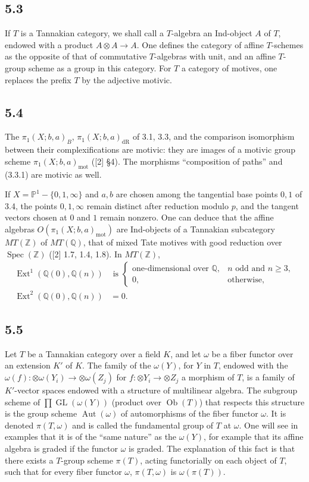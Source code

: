 \documentclass[10pt]{article}
\newcommand{\Q}{\mathbb Q}
\newcommand{\Z}{\mathbb Z}
\newcommand{\PP}{\mathbb P}
\newcommand{\Spec}{\operatorname{Spec}}
\newcommand{\Ext}{\operatorname{Ext}}
\newcommand{\Aut}{\operatorname{Aut}}
\newcommand{\GL}{\operatorname{GL}}
\newcommand{\Ob}{\operatorname{Ob}}
\newcommand{\dR}{\mathrm{dR}}
\newcommand{\mot}{\mathrm{mot}}
\begin{document}
\subsection*{5.3}
If $T$ is a Tannakian category, we shall call a $T$-algebra an Ind-object $A$ of $T$, endowed with a product $A\otimes A\to A$.
One defines the category of affine $T$-schemes as the opposite of that of commutative $T$-algebras with unit, and an affine $T$-group scheme as a group in this category.
For $T$ a category of motives, one replaces the prefix $T$ by the adjective motivic.

\subsection*{5.4}
The $\pi_1(X;b,a)_B$, $\pi_1(X;b,a)_{\dR}$ of 3.1, 3.3, and the comparison isomorphism between their complexifications are motivic: they are images of a motivic group scheme $\pi_1(X;b,a)_{\mot}$ ([2] \S4).
The morphisms ``composition of paths'' and (3.3.1) are motivic as well.

If $X=\PP^1-\{0,1,\infty\}$ and $a,b$ are chosen among the tangential base points $0,1$ of 3.4, the points $0,1,\infty$ remain distinct after reduction modulo $p$, and the tangent vectors chosen at $0$ and $1$ remain nonzero.
One can deduce that the affine algebras $O(\pi_1(X;b,a)_{\mot})$ are Ind-objects of a Tannakian subcategory $MT(\Z)$ of $MT(\Q)$, that of mixed Tate motives with good reduction over $\Spec(\Z)$ ([2] 1.7, 1.4, 1.8).
In $MT(\Z)$,
\begin{align}
 \Ext^1(\Q(0),\Q(n))&\text{ is }
 \begin{cases}
 \text{one-dimensional over }\Q,& n\text{ odd and }n\geq3,\\
 0,&\text{otherwise,}
 \end{cases}
\tag{5.4.1}\\
 \Ext^2(\Q(0),\Q(n))&=0.
\tag{5.4.2}
\end{align}

\subsection*{5.5}
Let $T$ be a Tannakian category over a field $K$, and let $\omega$ be a fiber functor over an extension $K'$ of $K$.
The family of the $\omega(Y)$, for $Y$ in $T$, endowed with the $\omega(f):\otimes\omega(Y_i)\to\otimes\omega(Z_j)$ for $f:\otimes Y_i\to\otimes Z_j$ a morphism of $T$, is a family of $K'$-vector spaces endowed with a structure of multilinear algebra.
The subgroup scheme of $\prod \GL(\omega(Y))$ (product over $\Ob(T)$) that respects this structure is the group scheme $\Aut(\omega)$ of automorphisms of the fiber functor $\omega$.
It is denoted $\pi(T,\omega)$ and is called the fundamental group of $T$ at $\omega$.
One will see in examples that it is of the ``same nature'' as the $\omega(Y)$, for example that its affine algebra is graded if the functor $\omega$ is graded.
The explanation of this fact is that there exists a $T$-group scheme $\pi(T)$, acting functorially on each object of $T$, such that for every fiber functor $\omega$, $\pi(T,\omega)$ is $\omega(\pi(T))$.
\end{document}
